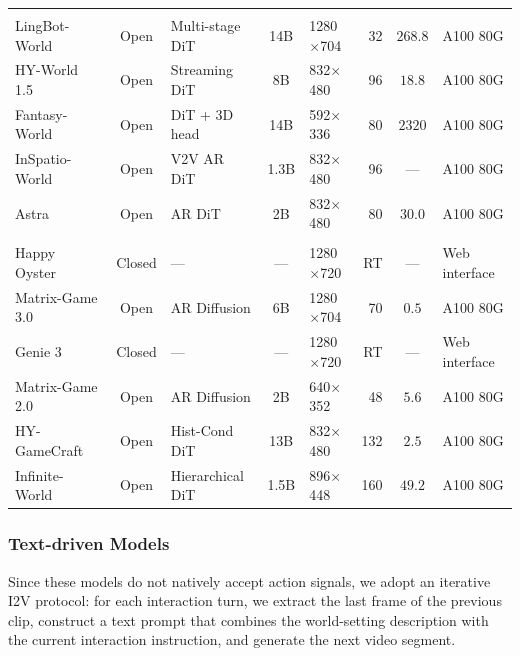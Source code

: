 \begin{table}[H]
\begin{tabular}{@{}lclclrcl@{}}
\addlinespace[4pt]
\multicolumn{8}{@{}l}{\textit{Camera-controlled models}} \\
\addlinespace[2pt]
LingBot-World~\cite{gao2026lingbot}          & Open   & Multi-stage DiT & 14B  & 1280$\times$704  & 32  & $268.8$ & A100 80G \\
HY-World 1.5~\cite{sun2025hyworldplay}       & Open   & Streaming DiT   & 8B   & 832$\times$480   & 96  & $18.8$  & A100 80G \\
Fantasy-World~\cite{fantasyworld2025}        & Open   & DiT + 3D head   & 14B  & 592$\times$336   & 80  & $2320$  & A100 80G \\
InSpatio-World~\cite{inspatio2026}           & Open   & V2V AR DiT      & 1.3B & 832$\times$480   & 96  & ---     & A100 80G \\
Astra~\cite{zhu2025astra}                    & Open   & AR DiT  & 2B   & 832$\times$480   & 80  & $30.0$  & A100 80G \\

\addlinespace[4pt]
\multicolumn{8}{@{}l}{\textit{Action-conditioned models}} \\
\addlinespace[2pt]
Happy Oyster~\cite{alibaba2026happyoyster}   & Closed & ---             & ---  & 1280$\times$720  & RT  & ---     & Web interface \\
Matrix-Game 3.0~\cite{he2026matrixgame3}     & Open   & AR Diffusion    & 6B   & 1280$\times$704  & 70  & $0.5$   & A100 80G \\
Genie 3~\cite{ball2025genie3}                & Closed & ---  & ---  & 1280$\times$720  & RT  & ---     & Web interface \\
Matrix-Game 2.0~\cite{he2025matrixgame2}     & Open   & AR Diffusion    & 2B   & 640$\times$352   & 48  & $5.6$   & A100 80G \\
HY-GameCraft~\cite{li2025hunyuangamecraft}   & Open   & Hist-Cond DiT   & 13B  & 832$\times$480   & 132 & $2.5$   & A100 80G \\
Infinite-World~\cite{wu2026infiniteworld}    & Open   & Hierarchical DiT & 1.5B & 896$\times$448   & 160 & $49.2$  & A100 80G \\

\bottomrule
\end{tabular}
\end{table}


\subsubsection{Text-driven Models}

Since these models do not natively accept action signals, we adopt an iterative I2V protocol: for each interaction turn, we extract the last frame of the previous clip, construct a text prompt that combines the world-setting description with the current interaction instruction, and generate the next video segment.


